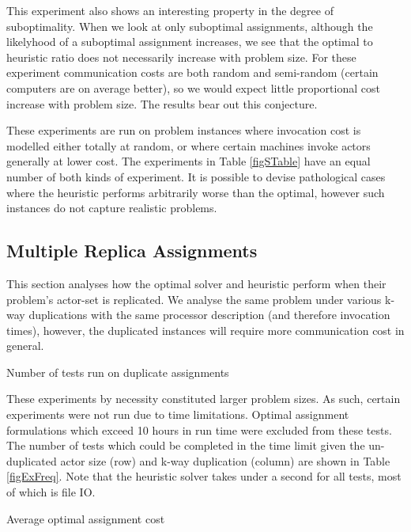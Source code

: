 This experiment also shows an interesting property in the degree of suboptimality.
When we look at only suboptimal assignments, although the likelyhood of a suboptimal assignment increases, we see that the optimal to heuristic ratio does not necessarily increase with problem size.
For these experiment communication costs are both random and semi-random (certain computers are on average better), so we would expect little proportional cost increase with problem size.
The results bear out this conjecture.

These experiments are run on problem instances where invocation cost is modelled either totally at random, or where certain machines invoke actors generally at lower cost.
The experiments in Table \ref{figSTable} have an equal number of both kinds of experiment.
It is possible to devise pathological cases where the heuristic performs arbitrarily worse than the optimal, however such instances do not capture realistic problems.

\subsection{Multiple Replica Assignments}
\label{secExMulAssign}

This section analyses how the optimal solver and heuristic perform when their problem's actor-set is replicated.
We analyse the same problem under various k-way duplications with the same processor description (and therefore invocation times), however, the duplicated instances will require more communication cost in general.

\begin{table}
\begin{center}
	
\caption{Number of tests run on duplicate assignments}
\label{figExFreq}
\end{center}
\end{table}

These experiments by necessity constituted larger problem sizes.
As such, certain experiments were not run due to time limitations.
Optimal assignment formulations which exceed 10 hours in run time were excluded from these tests.
The number of tests which could be completed in the time limit given the un-duplicated actor size (row) and k-way duplication (column) are shown in Table \ref{figExFreq}.
Note that the heuristic solver takes under a second for all tests, most of which is file IO.

\begin{table}
\begin{center}
	
\caption{Average optimal assignment cost}
\label{figExRamp}
\end{center}
\end{table}

